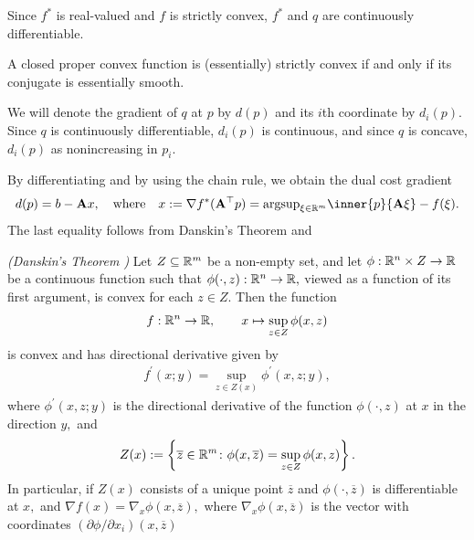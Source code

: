 Since $f^*$ is real-valued and $f$ is strictly convex, 
$f^*$ and $q$ are continuously differentiable.

\begin{theorem}
  \emph{\cite[Theorem~26.3]{Rockafellar1970}}
  A closed proper convex function is (essentially) strictly convex
  if and only if its conjugate is essentially smooth.
\end{theorem}

We will denote the gradient of $q$ at $p$ by $d(p)$
and its $i$th coordinate by $d_i(p).$
Since $q$ is continuously differentiable, $d_i(p)$ is continuous, 
and since $q$ is concave, 
$d_i(p)$ as nonincreasing in $p_i.$

By differentiating and by using the chain rule, 
we obtain the dual cost gradient
\begin{gather}
  d(p)=b-\mathbf{A}x,
  \quad
  \text{where}
  \quad
  x:=
  \nabla
  f^*
  (
    \mathbf{A}^\top
    p
  )
  =
  \mathrm{argsup}
  _{\xi \in \R^m}
  \inner{p}{\mathbf{A}\xi}
  - f(\xi)
  .
\end{gather}
The last equality follows from Danskin's Theorem and \cite[Theorem~23.5]{Rockafellar1970}


\begin{proposition}
  \emph{(Danskin's Theorem \cite[page 649]{Bertsekas2003})}
  Let 
  $
    Z \subseteq \mathbb{R}^m
  $
  be a non-empty set, 
  and let 
  $
    \phi :
    \mathbb{R}^n \times Z \to \mathbb{R}
  $
  be a continuous function such that
  $
    \phi(\cdot,z)
    :
    \mathbb{R}^n \to \mathbb{R},
  $
  viewed as a function of its first argument, 
  is convex for each 
  $
    z \in Z.
  $
  Then the function 
  \begin{gather}
    f:\mathbb{R}^n \to \mathbb{R}
    ,
    \qquad
    x\mapsto
    \sup_{z\in Z}
    \phi(x,z)
  \end{gather}
  is convex and has directional derivative given by
  \begin{gather}
    f^{'}(x;y)
    =
    \sup_{z \in Z(x)}
    \phi^{'}(x,z; y)
    ,
  \end{gather}
  where 
  $
    \phi^{'}(x,z; y)
  $
  is the directional derivative of the function 
  $
    \phi(\cdot,z)
  $
  at
  $x$ in the direction $y,$
  and
  \begin{gather}
    Z(x)
    :=
    \left\{ 
      \overline{z} \in \mathbb{R}^m
      \colon
      \phi(x, \overline{z})
      =
    \sup_{z\in Z}
    \phi(x,z)
  \right\}
  .
  \end{gather}
  In particular, if $Z(x)$ consists of a unique point 
  $\overline{z}$
  and
  $
    \phi(\cdot, \overline{z})
  $
  is differentiable at $x,$
  and 
  $
    \nabla f(x)
    =
    \nabla_x
    \phi(x,\overline{z})
    ,
  $
  where 
  $
    \nabla_x
    \phi(x,\overline{z})
  $
  is the vector with coordinates
  $
    (\partial \phi / \partial x_i)
    (x,\overline{z})
  $
\end{proposition}

